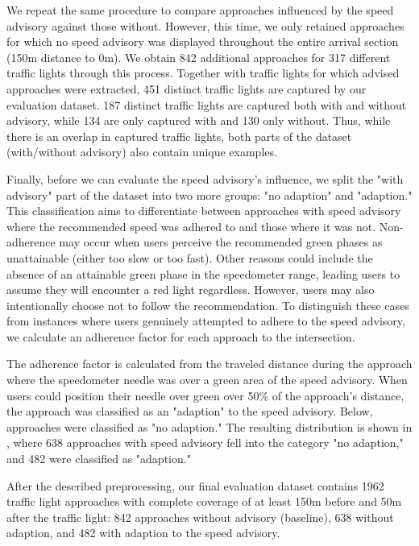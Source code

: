 We repeat the same procedure to compare approaches influenced by the speed advisory against those without. However, this time, we only retained approaches for which no speed advisory was displayed throughout the entire arrival section (150m distance to 0m). We obtain 842 additional approaches for 317 different traffic lights through this process. Together with traffic lights for which advised approaches were extracted, 451 distinct traffic lights are captured by our evaluation dataset. 187 distinct traffic lights are captured both with and without advisory, while 134 are only captured with and 130 only without. Thus, while there is an overlap in captured traffic lights, both parts of the dataset (with/without advisory) also contain unique examples.

Finally, before we can evaluate the speed advisory's influence, we split the "with advisory" part of the dataset into two more groups: "no adaption" and "adaption." This classification aims to differentiate between approaches with speed advisory where the recommended speed was adhered to and those where it was not. Non-adherence may occur when users perceive the recommended green phases as unattainable (either too slow or too fast). Other reasons could include the absence of an attainable green phase in the speedometer range, leading users to assume they will encounter a red light regardless. However, users may also intentionally choose not to follow the recommendation. To distinguish these cases from instances where users genuinely attempted to adhere to the speed advisory, we calculate an adherence factor for each approach to the intersection.

The adherence factor is calculated from the traveled distance during the approach where the speedometer needle was over a green area of the speed advisory. When users could position their needle over green over 50\% of the approach's distance, the approach was classified as an "adaption" to the speed advisory. Below, approaches were classified as "no adaption." The resulting distribution is shown in , where 638 approaches with speed advisory fell into the category "no adaption," and 482 were classified as "adaption."

After the described preprocessing, our final evaluation dataset contains 1962 traffic light approaches with complete coverage of at least 150m before and 50m after the traffic light: 842 approaches without advisory (baseline), 638 without adaption, and 482 with adaption to the speed advisory.

